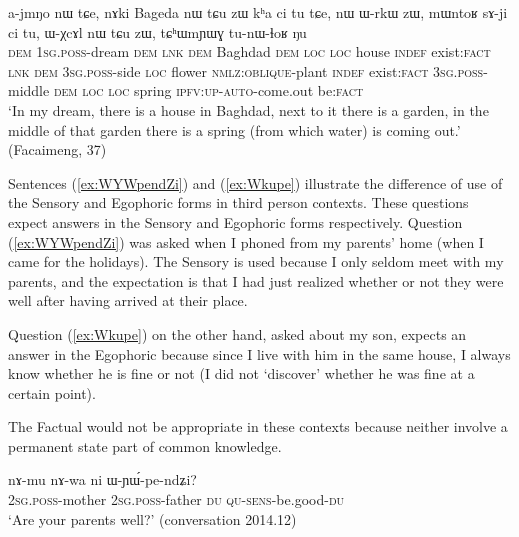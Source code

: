 \documentclass[oldfontcommands,oneside,a4paper,11pt]{article}
\newcommand{\ipa}[1]{{\phon \mbox{#1}}} %
\newcommand{\refb}[1]{(\ref{#1})}
\begin{document}
\begin{exe}
\ex  \label{ex:ajmNo}
\gll \ipa{nɯ}	\ipa{a-jmŋo}	\ipa{nɯ}	\ipa{tɕe,}	\ipa{nɤki} Bageda	\ipa{nɯ} \ipa{tɕu}	\ipa{zɯ}	\ipa{kʰa}	\ipa{ci}	\ipa{tu}	\ipa{tɕe,} \ipa{nɯ}	\ipa{ɯ-rkɯ}	\ipa{zɯ,}	\ipa{mɯntoʁ}	\ipa{sɤ-ji}	\ipa{ci}	\ipa{tu,}	\ipa{ɯ-χcɤl}	\ipa{nɯ} \ipa{tɕu}	\ipa{zɯ,}	\ipa{tɕʰɯmɲɯɣ}	\ipa{tu-nɯ-ɬoʁ}	\ipa{ŋu} \\
\textsc{dem} \textsc{1sg.poss}-dream \textsc{dem} \textsc{lnk} \textsc{dem} Baghdad \textsc{dem} \textsc{loc} \textsc{loc} house \textsc{indef} exist:\textsc{fact} \textsc{lnk} \textsc{dem} \textsc{3sg.poss}-side \textsc{loc} flower \textsc{nmlz:oblique}-plant \textsc{indef} exist:\textsc{fact} \textsc{3sg.poss}-middle 
\textsc{dem} \textsc{loc} \textsc{loc} spring \textsc{ipfv:up-auto}-come.out be:\textsc{fact} \\
\glt `In my dream, there is a house in Baghdad, next to it there is a garden, in the middle of that garden there is a spring (from which water) is coming out.' (Facaimeng, 37)
\end{exe}

Sentences \refb{ex:WYWpendZi} and \refb{ex:Wkupe} illustrate the difference of use of the Sensory and Egophoric forms in third person contexts. These questions expect answers in the Sensory and Egophoric forms respectively. Question \refb{ex:WYWpendZi} was asked when I phoned from my parents' home (when I came for the holidays). The Sensory is used because I only seldom meet with my parents, and the expectation is that I had just realized whether or not they were well after having arrived at their place. 

Question \refb{ex:Wkupe} on the other hand, asked about my son, expects an answer in the Egophoric because since I live with him in the same house, I always know whether he is fine or not (I did not `discover' whether he was fine at a certain point).

The Factual would not be appropriate in these contexts because neither involve a permanent state part of common knowledge.

\begin{exe}
\ex \label{ex:WYWpendZi}
\gll 
\ipa{nɤ-mu}  	\ipa{nɤ-wa}  	\ipa{ni}  	\ipa{ɯ-ɲɯ́-pe-ndʑi?}  \\
\textsc{2sg.poss}-mother \textsc{2sg.poss}-father \textsc{du} \textsc{qu-sens}-be.good-\textsc{du} \\
\glt `Are your parents well?' (conversation 2014.12)
\end{exe}
\end{document}
